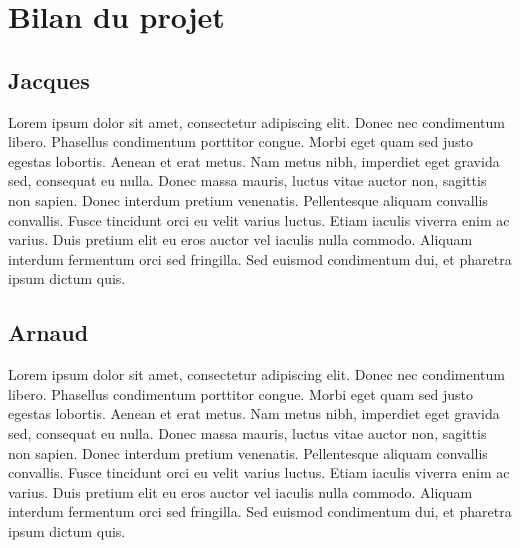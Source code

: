 \documentclass{report}
\begin{document}
\chapter{Bilan du projet}
\section{Jacques}
Lorem ipsum dolor sit amet, consectetur adipiscing elit.
Donec nec condimentum libero. Phasellus condimentum porttitor congue.
Morbi eget quam sed justo egestas lobortis. Aenean et erat metus.
Nam metus nibh, imperdiet eget gravida sed, consequat eu nulla. Donec massa mauris, luctus vitae auctor non, sagittis non sapien.
Donec interdum pretium venenatis. Pellentesque aliquam convallis convallis.
Fusce tincidunt orci eu velit varius luctus. Etiam iaculis viverra enim ac varius.
Duis pretium elit eu eros auctor vel iaculis nulla commodo. Aliquam interdum fermentum orci sed fringilla.
Sed euismod condimentum dui, et pharetra ipsum dictum quis.

\section{Arnaud}
Lorem ipsum dolor sit amet, consectetur adipiscing elit.
Donec nec condimentum libero. Phasellus condimentum porttitor congue.
Morbi eget quam sed justo egestas lobortis. Aenean et erat metus.
Nam metus nibh, imperdiet eget gravida sed, consequat eu nulla. Donec massa mauris, luctus vitae auctor non, sagittis non sapien.
Donec interdum pretium venenatis. Pellentesque aliquam convallis convallis.
Fusce tincidunt orci eu velit varius luctus. Etiam iaculis viverra enim ac varius.
Duis pretium elit eu eros auctor vel iaculis nulla commodo. Aliquam interdum fermentum orci sed fringilla.
Sed euismod condimentum dui, et pharetra ipsum dictum quis.
\end{document}
